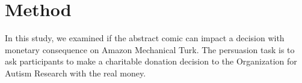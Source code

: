 \section{Method}
\label{sec:Method}
In this study, we examined if the abstract comic can impact a decision with monetary consequence on Amazon Mechanical Turk. The persuasion task is to ask participants to make a charitable donation decision to the Organization for Autism Research with the real money. 


